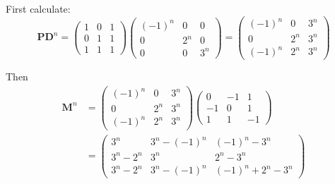 \documentclass[leqno]{article}
\begin{document}
\begin{enumerate}[
  label=\textbf{\arabic*.},
  leftmargin=*,
  topsep=0pt,
  partopsep=0pt,
  parsep=0pt
]
\begin{djsSolution}
\begin{enumerate}[label=\textbf{(\alph*)}, start=1]
First calculate:
\[
\mathbf{P}\mathbf{D}^n=\begin{pmatrix} 1 & 0 & 1 \\ 0 & 1 & 1 \\ 1 & 1 & 1 \end{pmatrix}\begin{pmatrix} (-1)^n & 0 & 0 \\ 0 & 2^n & 0 \\ 0 & 0 & 3^n \end{pmatrix}=\begin{pmatrix} (-1)^n & 0 & 3^n \\ 0 & 2^n & 3^n \\ (-1)^n & 2^n & 3^n \end{pmatrix}
\]

Then
\begin{align*}
\mathbf{M}^n&=\begin{pmatrix} (-1)^n & 0 & 3^n \\ 0 & 2^n & 3^n \\ (-1)^n & 2^n & 3^n \end{pmatrix}\begin{pmatrix} 0 & -1 & 1 \\ -1 & 0 & 1 \\ 1 & 1 & -1 \end{pmatrix}\\
&=\begin{pmatrix} 3^n & 3^n-(-1)^n & (-1)^n-3^n \\ 3^n-2^n & 3^n & 2^n-3^n \\ 3^n-2^n & 3^n-(-1)^n & (-1)^n+2^n-3^n \end{pmatrix}
\end{align*}

\end{enumerate}
\end{djsSolution}

\newpage

\questionitem


\end{enumerate}
\end{document}
